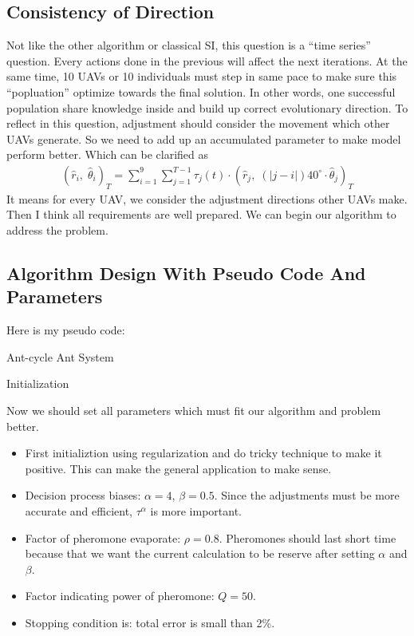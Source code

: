 \documentclass[11pt,en]{elegantpaper}
\begin{document}
\subsection{Consistency of Direction}
Not like the other algorithm or classical SI, this question is a ``time series'' question.
Every actions done in the previous will affect the next iterations.
At the same time, 10 UAVs or 10 individuals must step in same pace to make sure this ``popluation'' optimize towards
the final solution.
In other words, one successful population share knowledge inside and build up correct evolutionary direction.
To reflect in this question, adjustment should consider the movement which other UAVs generate.
So we need to add up an accumulated parameter to make model perform better.
Which can be clarified as 
\begin{align*}
  (\hat{r}_i,\; \hat{\theta}_i)_T = \sum_{i=1}^{9} \sum_{j=1}^{T-1} \tau_j(t)\cdot (\hat{r}_j,\; (\lvert j-i\rvert)40^{\circ}\cdot\hat{\theta}_j)_T
\end{align*}
It means for every UAV, we consider the adjustment directions other UAVs make.
Then I think all requirements are well prepared. We can begin our algorithm to address the problem.

\subsection{Algorithm Design With Pseudo Code And Parameters}
Here is my pseudo code:
\par
\begin{algorithm}[H]
    \caption{Ant-cycle Ant System}
    Initialization\;
\end{algorithm}
\par
Now we should set all parameters which must fit our algorithm and problem better.
\begin{itemize}
  \item First initializtion using regularization and do tricky technique to make it positive.
  This can make the general application to make sense.
  \item Decision process biases: $\alpha = 4$, $\beta = 0.5$.
  Since the adjustments must be more accurate and efficient, $\tau^{\alpha}$ is more important.
  \item Factor of pheromone evaporate: $\rho = 0.8$.
  Pheromones should last short time because that we want the current calculation to be reserve after setting $\alpha$ and $\beta$.
  \item Factor indicating power of pheromone: $Q = 50$.
  \item Stopping condition is: total error is small than 2\%.
\end{itemize}
\end{document}
